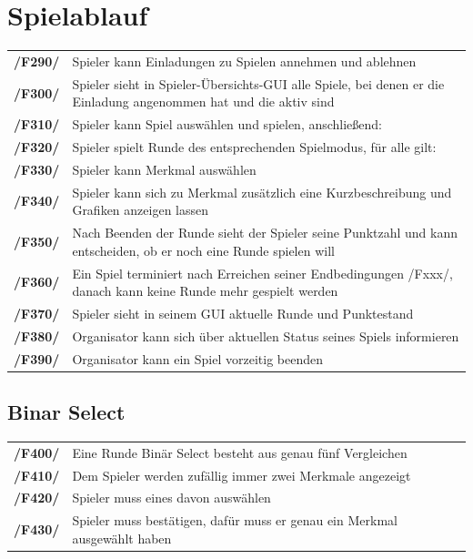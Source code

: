 \documentclass[a4paper]{scrreprt}
\begin{document}
    \section{Spielablauf} 
    \begin{tabularx}{\linewidth}{@{}>{\bfseries}l@{\hspace{.5em}}X@{}}
    /F290/ & \Gls{Spieler} kann Einladungen zu Spielen annehmen und ablehnen \\
    /F300/ & \Gls{Spieler} sieht in Spieler-Übersichts-GUI alle Spiele, bei denen er die Einladung angenommen hat und die aktiv sind \\
    /F310/ & \Gls{Spieler} kann \Gls{Spiel} auswählen und spielen, anschließend: \\
    /F320/ & \Gls{Spieler} spielt Runde des entsprechenden \Gls{Spielmodus}, für alle gilt: \\
    /F330/ & \Gls{Spieler} kann Merkmal auswählen \\
    /F340/ & \Gls{Spieler} kann sich zu Merkmal zusätzlich eine Kurzbeschreibung und Grafiken anzeigen lassen \\
    /F350/ & Nach Beenden der Runde sieht der \Gls{Spieler} seine Punktzahl und kann entscheiden, ob er noch eine Runde spielen will \\
	/F360/ & Ein \Gls{Spiel} terminiert nach Erreichen seiner Endbedingungen /Fxxx/, danach kann keine Runde mehr gespielt werden \\
    /F370/ & \Gls{Spieler} sieht in seinem GUI aktuelle Runde und Punktestand \\
	/F380/ & \Gls{Organisator} kann sich über aktuellen Status seines Spiels informieren \\ %
	/F390/ & \Gls{Organisator} kann ein \Gls{Spiel} vorzeitig beenden \\
    \end{tabularx}
    
    \subsection{\Gls{Binar Select}}
    \begin{tabularx}{\linewidth}{@{}>{\bfseries}l@{\hspace{.5em}}X@{}}
        /F400/ & Eine Runde Binär Select besteht aus genau fünf Vergleichen \\
    	/F410/ & Dem \Gls{Spieler} werden zufällig immer zwei Merkmale angezeigt \\
    	/F420/ & \Gls{Spieler} muss eines davon auswählen \\
    	/F430/ & \Gls{Spieler} muss bestätigen, dafür muss er genau ein Merkmal ausgewählt haben \\
    \end{tabularx}
\end{document}
